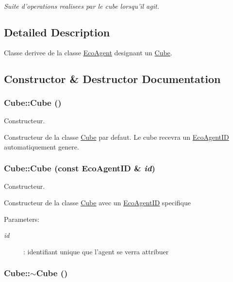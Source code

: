 \begin{CompactItemize}
\begin{CompactList}\small\item\em Suite d'operations realisees par le cube lorsqu'il agit. \item\end{CompactList}\end{CompactItemize}


\subsection{Detailed Description}
Classe derivee de la classe \hyperlink{classEcoAgent}{EcoAgent} designant un \hyperlink{classCube}{Cube}. 

\subsection{Constructor \& Destructor Documentation}
\hypertarget{classCube_06f3d86fb63e3aad08623610aa3c17b4}{
\subsubsection[{Cube}]{\setlength{\rightskip}{0pt plus 5cm}Cube::Cube ()}}
\label{classCube_06f3d86fb63e3aad08623610aa3c17b4}


Constructeur. 

Constructeur de la classe \hyperlink{classCube}{Cube} par defaut. Le cube recevra un \hyperlink{classEcoAgentID}{EcoAgentID} automatiquement genere. \hypertarget{classCube_4793068a114fd49b51233e8f81884189}{
\subsubsection[{Cube}]{\setlength{\rightskip}{0pt plus 5cm}Cube::Cube (const {\bf EcoAgentID} \& {\em id})}}
\label{classCube_4793068a114fd49b51233e8f81884189}


Constructeur. 

Constructeur de la classe \hyperlink{classCube}{Cube} avec un \hyperlink{classEcoAgentID}{EcoAgentID} specifique

\begin{Desc}
\item[Parameters:]
\begin{description}
\item[{\em id}]: identifiant unique que l'agent se verra attribuer \end{description}
\end{Desc}
\hypertarget{classCube_a814e979cecb8c451fdb332ded2cea1e}{
\subsubsection[{$\sim$Cube}]{\setlength{\rightskip}{0pt plus 5cm}Cube::$\sim$Cube ()}}
\label{classCube_a814e979cecb8c451fdb332ded2cea1e}


